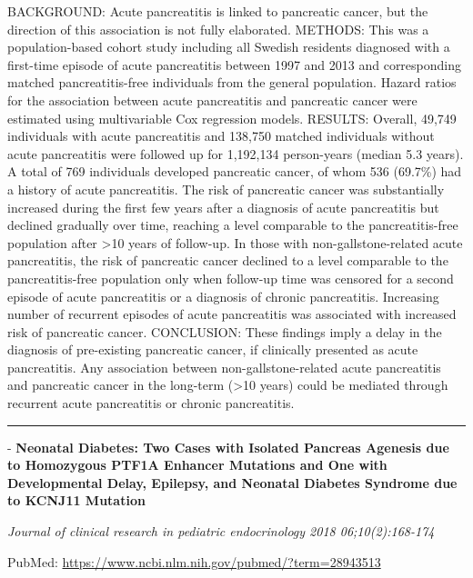 \documentclass[]{article}
\begin{document}
BACKGROUND: Acute pancreatitis is linked to pancreatic cancer, but the
direction of this association is not fully elaborated. METHODS: This was
a population-based cohort study including all Swedish residents
diagnosed with a first-time episode of acute pancreatitis between 1997
and 2013 and corresponding matched pancreatitis-free individuals from
the general population. Hazard ratios for the association between acute
pancreatitis and pancreatic cancer were estimated using multivariable
Cox regression models. RESULTS: Overall, 49,749 individuals with acute
pancreatitis and 138,750 matched individuals without acute pancreatitis
were followed up for 1,192,134 person-years (median 5.3 years). A total
of 769 individuals developed pancreatic cancer, of whom 536 (69.7\%) had
a history of acute pancreatitis. The risk of pancreatic cancer was
substantially increased during the first few years after a diagnosis of
acute pancreatitis but declined gradually over time, reaching a level
comparable to the pancreatitis-free population after \textgreater{}10
years of follow-up. In those with non-gallstone-related acute
pancreatitis, the risk of pancreatic cancer declined to a level
comparable to the pancreatitis-free population only when follow-up time
was censored for a second episode of acute pancreatitis or a diagnosis
of chronic pancreatitis. Increasing number of recurrent episodes of
acute pancreatitis was associated with increased risk of pancreatic
cancer. CONCLUSION: These findings imply a delay in the diagnosis of
pre-existing pancreatic cancer, if clinically presented as acute
pancreatitis. Any association between non-gallstone-related acute
pancreatitis and pancreatic cancer in the long-term (\textgreater{}10
years) could be mediated through recurrent acute pancreatitis or chronic
pancreatitis.

{}

{}

\begin{center}\rule{0.5\linewidth}{\linethickness}\end{center}

 - \textbf{Neonatal Diabetes: Two Cases with Isolated Pancreas Agenesis
due to Homozygous PTF1A Enhancer Mutations and One with Developmental
Delay, Epilepsy, and Neonatal Diabetes Syndrome due to KCNJ11 Mutation}

\emph{Journal of clinical research in pediatric endocrinology 2018
06;10(2):168-174}

PubMed: \url{https://www.ncbi.nlm.nih.gov/pubmed/?term=28943513}
\end{document}

